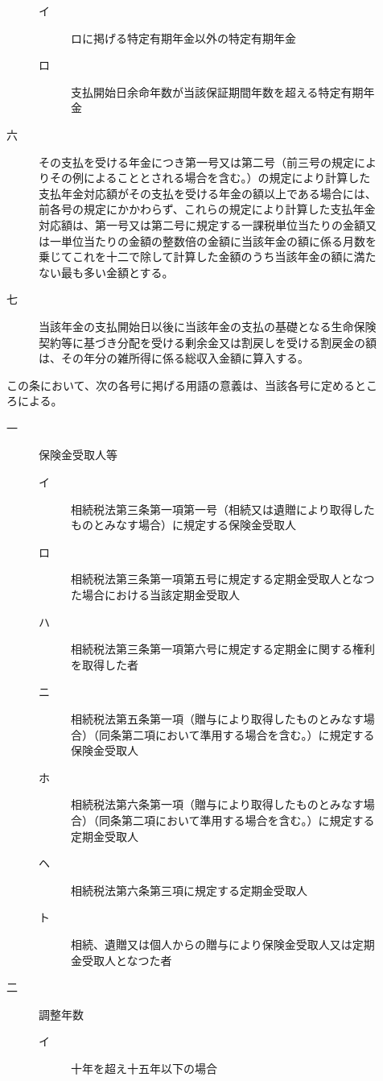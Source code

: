 \documentclass[twocolumn,a4j,10pt]{ltjtarticle}
\begin{document}
\begin{description}
\begin{description}
\begin{description}
\item[イ]ロに掲げる特定有期年金以外の特定有期年金
\item[ロ]支払開始日余命年数が当該保証期間年数を超える特定有期年金
\end{description}
\item[六]その支払を受ける年金につき第一号又は第二号（前三号の規定によりその例によることとされる場合を含む。）の規定により計算した支払年金対応額がその支払を受ける年金の額以上である場合には、前各号の規定にかかわらず、これらの規定により計算した支払年金対応額は、第一号又は第二号に規定する一課税単位当たりの金額又は一単位当たりの金額の整数倍の金額に当該年金の額に係る月数を乗じてこれを十二で除して計算した金額のうち当該年金の額に満たない最も多い金額とする。
\item[七]当該年金の支払開始日以後に当該年金の支払の基礎となる生命保険契約等に基づき分配を受ける剰余金又は割戻しを受ける割戻金の額は、その年分の雑所得に係る総収入金額に算入する。
\end{description}
\item[\rensuji{3}]この条において、次の各号に掲げる用語の意義は、当該各号に定めるところによる。
\begin{description}
\item[一]保険金受取人等
\begin{description}
\item[イ]相続税法第三条第一項第一号（相続又は遺贈により取得したものとみなす場合）に規定する保険金受取人
\item[ロ]相続税法第三条第一項第五号に規定する定期金受取人となつた場合における当該定期金受取人
\item[ハ]相続税法第三条第一項第六号に規定する定期金に関する権利を取得した者
\item[ニ]相続税法第五条第一項（贈与により取得したものとみなす場合）（同条第二項において準用する場合を含む。）に規定する保険金受取人
\item[ホ]相続税法第六条第一項（贈与により取得したものとみなす場合）（同条第二項において準用する場合を含む。）に規定する定期金受取人
\item[ヘ]相続税法第六条第三項に規定する定期金受取人
\item[ト]相続、遺贈又は個人からの贈与により保険金受取人又は定期金受取人となつた者
\end{description}
\item[二]調整年数
\begin{description}
\item[イ]十年を超え十五年以下の場合

\end{description}
\end{description}
\end{description}
\end{document}
